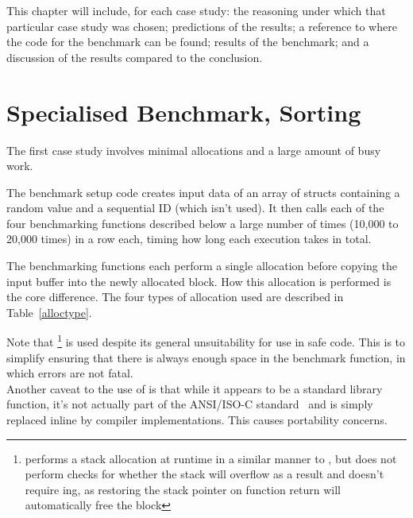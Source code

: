 This chapter will include, for each case study: the reasoning under which that particular case study was chosen; predictions of the results; a reference to where the code for the benchmark can be found; results of the benchmark; and a discussion of the results compared to the conclusion.

\section{Specialised Benchmark, Sorting}

The first case study involves minimal allocations and a large amount of busy work.

The benchmark setup code creates input data of an array of structs containing a random value and a sequential ID (which isn't used). It then calls each of the four benchmarking functions described below a large number of times (10,000 to 20,000 times) in a row each, timing how long each execution takes in total.

The benchmarking functions each perform a single allocation before copying the input buffer into the newly allocated block. How this allocation is performed is the core difference. The four types of allocation used are described in Table~\ref{alloctype}.

Note that \footnote{ performs a stack allocation at runtime in a similar manner to \malloc{}, but does not perform checks for whether the stack will overflow as a result and doesn't require \free{}ing, as restoring the stack pointer on function return will automatically free the block} is used despite its general unsuitability for use in safe code. This is to simplify ensuring that there is always enough space in the  benchmark function, in which errors are not fatal.\\
Another caveat to the use of  is that while it appears to be a standard library function, it's not actually part of the ANSI/ISO-C standard~\cite{c11std} and is simply replaced inline by compiler implementations. This causes portability concerns.

